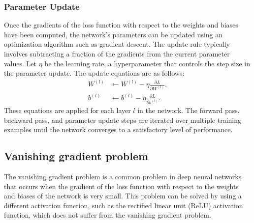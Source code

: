 \documentclass[a4paper, noexaminfo]{sapthesis}
\begin{document}
\subsubsection{Parameter Update}
Once the gradients of the loss function with respect to the weights 
and biases have been computed, the network's parameters can be updated 
using an optimization algorithm such as gradient descent. The update 
rule typically involves subtracting a fraction of the gradients from 
the current parameter values.\newline
Let $\eta$ be the learning rate, a hyperparameter that controls the step size in the parameter update. The update equations are as follows:
\begin{align*}
  W^{(l)} &\leftarrow W^{(l)} - \eta \frac{\partial L}{\partial W^{(l)}}, \\
  b^{(l)} &\leftarrow b^{(l)} - \eta \frac{\partial L}{\partial b^{(l)}}.
\end{align*}
These equations are applied for each layer $l$ in the network.\newline
The forward pass, backward pass, and parameter update steps are iterated 
over multiple training examples until the network converges to a 
satisfactory level of performance.
\subsection{Vanishing gradient problem}\label{sec:vanishing_gradient}
The vanishing gradient problem is a common problem in deep neural networks
 that occurs when the gradient of the loss function with respect to the
  weights and biases of the network is very small. This problem can be 
  solved by using a different activation function, such as the rectified 
  linear unit (ReLU) activation function, which does not suffer from the 
  vanishing gradient problem.
\end{document}
